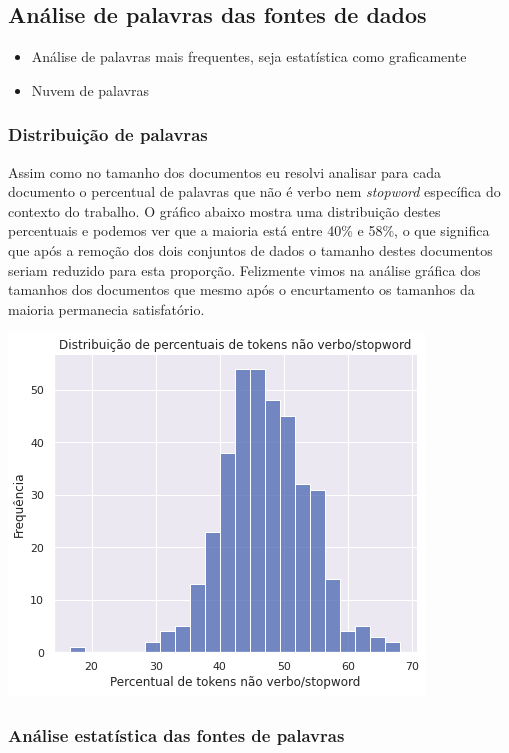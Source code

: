 \subsection{Análise de palavras das fontes de dados}

\begin{itemize}
    \item Análise de palavras mais frequentes, seja estatística como graficamente
    \item Nuvem de palavras
\end{itemize}

\subsubsection{Distribuição de palavras}

Assim como no tamanho dos documentos eu resolvi analisar para cada documento o percentual de palavras que não é verbo nem 
\textit{stopword} específica do contexto do trabalho. O gráfico abaixo mostra uma distribuição destes percentuais e podemos ver que a 
maioria está entre 40\% e 58\%, o que significa que após a remoção dos dois conjuntos de dados o tamanho destes documentos seriam 
reduzido para esta proporção. Felizmente vimos na análise gráfica dos tamanhos dos documentos que mesmo após o encurtamento os tamanhos
da maioria permanecia satisfatório.

\includegraphics[scale=0.75]{explore/resources/analise_palavras_distribuicao_perc_nao_verbo_stopword.png}

\subsubsection{Análise estatística das fontes de palavras}

